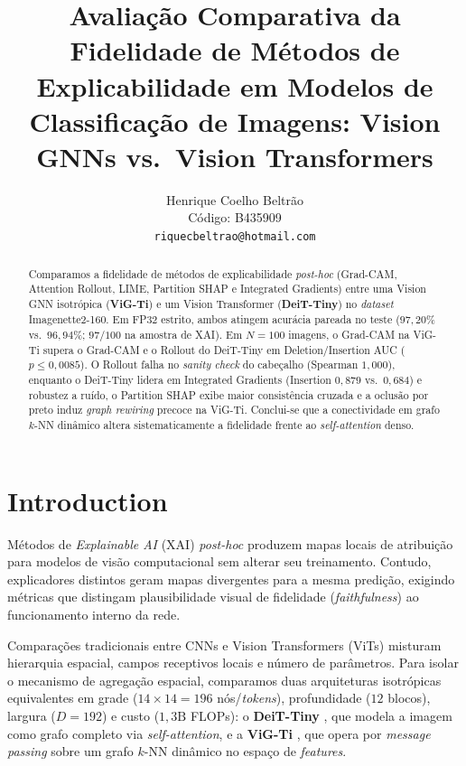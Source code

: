 \documentclass{article}
\title{Avaliação Comparativa da Fidelidade de Métodos de Explicabilidade em Modelos de Classificação de Imagens: Vision GNNs vs.\ Vision Transformers}
\author{%
  Henrique Coelho Beltrão \\
  Código: B435909 \\
  \texttt{riquecbeltrao@hotmail.com} \\
}
\begin{document}
\maketitle

\begin{abstract}
Comparamos a fidelidade de métodos de explicabilidade \textit{post-hoc} (Grad-CAM, Attention Rollout, LIME, Partition SHAP e Integrated Gradients) entre uma Vision GNN isotrópica (\textbf{ViG-Ti}) e um Vision Transformer (\textbf{DeiT-Tiny}) no \textit{dataset} Imagenette2-160. Em FP32 estrito, ambos atingem acurácia pareada no teste ($97{,}20\%$ vs.\ $96{,}94\%$; $97/100$ na amostra de XAI). Em $N = 100$ imagens, o Grad-CAM na ViG-Ti supera o Grad-CAM e o Rollout do DeiT-Tiny em Deletion/Insertion AUC ($p \le 0{,}0085$). O Rollout falha no \textit{sanity check} do cabeçalho (Spearman $1{,}000$), enquanto o DeiT-Tiny lidera em Integrated Gradients (Insertion $0{,}879$ vs.\ $0{,}684$) e robustez a ruído, o Partition SHAP exibe maior consistência cruzada e a oclusão por preto induz \textit{graph rewiring} precoce na ViG-Ti. Conclui-se que a conectividade em grafo $k$-NN dinâmico altera sistematicamente a fidelidade frente ao \textit{self-attention} denso.
\end{abstract}

\section{Introduction}
\label{sec:intro}

Métodos de \textit{Explainable AI} (XAI) \textit{post-hoc} produzem mapas locais de atribuição para modelos de visão computacional sem alterar seu treinamento. Contudo, explicadores distintos geram mapas divergentes para a mesma predição, exigindo métricas que distingam plausibilidade visual de fidelidade (\textit{faithfulness}) ao funcionamento interno da rede.

Comparações tradicionais entre CNNs e Vision Transformers (ViTs) misturam hierarquia espacial, campos receptivos locais e número de parâmetros. Para isolar o mecanismo de agregação espacial, comparamos duas arquiteturas isotrópicas equivalentes em grade ($14 \times 14 = 196$ nós/\textit{tokens}), profundidade ($12$ blocos), largura ($D = 192$) e custo ($1{,}3\text{B}$ FLOPs): o \textbf{DeiT-Tiny} \citep{dosovitskiy2021vit,touvron2021deit}, que modela a imagem como grafo completo via \textit{self-attention}, e a \textbf{ViG-Ti} \citep{han2022vig}, que opera por \textit{message passing} sobre um grafo $k$-NN dinâmico no espaço de \textit{features}.
\end{document}
